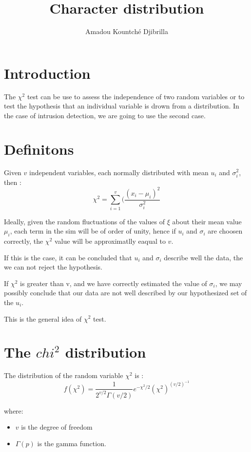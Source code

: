 \documentclass[a4paper,10pt]{article}
\title{Character distribution}
\author{Amadou Kountché Djibrilla}
\begin{document}
\maketitle



\section{Introduction}
The $\chi^2$ test can be use to assess the independence of two random variables or to test the hypothesis
that an individual variable is drown from a distribution. 
In the case of intrusion detection, we are going to use the second case. 


\section{Definitons}
Given $v$ independent variables, each normally distributed with mean $u_i$ and $\sigma^2_i$, then :
\begin{equation}
 \chi^2 = \sum^{v}_{i=1} (\frac{(x_i - \mu_i)^2}{\sigma^{2}_{i}}
\end{equation}

Ideally, given the random fluctuations of the values of $\xi$ about their mean value $\mu_i$, each term in the sim will be of order of unity, 
hence if $u_i$ and $\sigma_i$ are choosen correctly, the $\chi^2$ value will be approximatlly eaqual to $v$.

If this is the case, it can be concluded that $u_i$ and $\sigma_i$ describe well the data, the we can not reject the hypothesis. 


If $\chi^2$ is greater than v, and we have correctly estimated the value of $\sigma_i$, we may possibly conclude that our data are not well described by our hypothesized set
of the $u_i$. 

This is the general idea of $\chi^2$ test. 


\section{The $chi^2$ distribution}

The distribution of the random variable $\chi^2$ is :
\begin{equation}
 f(\chi^2) = \frac{1}{2^{v/2} \Gamma (v/2)} e^{-\chi^2/2}(\chi^2)^{(v/2)^{-1}}
\end{equation}

where: 
\begin{itemize}
 \item $v$ is the degree of freedom
 \item $\Gamma(p)$ is the gamma function. 
 
\end{itemize}
\end{document}
